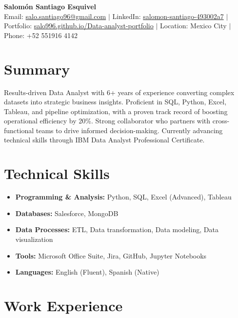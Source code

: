 \documentclass[11pt,a4paper]{article}
\begin{document}
\begin{center}
{\Huge\bfseries Salomón Santiago Esquivel}\\[0.2em]
{\large 
Email: \href{mailto:salo.santiago96@gmail.com}{salo.santiago96@gmail.com} $\mid$ 
LinkedIn: \href{https://linkedin.com/in/salomon-santiago-493002a7/}{salomon-santiago-493002a7} $\mid$ 
Portfolio: \href{https://salo996.github.io/Data-analyst-portfolio/}{salo996.github.io/Data-analyst-portfolio} $\mid$ 
Location: Mexico City $\mid$ Phone: +52 551916 4142
}
\end{center}

\vspace{0.2em}

\section{Summary}
Results-driven Data Analyst with 6+ years of experience converting complex datasets into strategic business insights. Proficient in SQL, Python, Excel, Tableau, and pipeline optimization, with a proven track record of boosting operational efficiency by 20\%. Strong collaborator who partners with cross-functional teams to drive informed decision-making. Currently advancing technical skills through IBM Data Analyst Professional Certificate.

\section{Technical Skills}
\begin{itemize}
  \item \textbf{Programming \& Analysis:} Python, SQL, Excel (Advanced), Tableau
  \item \textbf{Databases:} Salesforce, MongoDB
  \item \textbf{Data Processes:} ETL, Data transformation, Data modeling, Data visualization
  \item \textbf{Tools:} Microsoft Office Suite, Jira, GitHub, Jupyter Notebooks
  \item \textbf{Languages:} English (Fluent), Spanish (Native)
\end{itemize}

\section{Work Experience}
\end{document}
